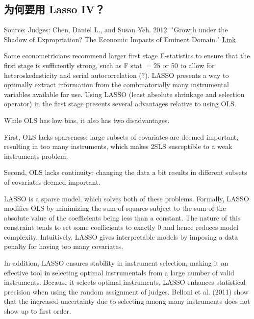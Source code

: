 {\subsection{为何要用 Lasso IV？}

Source: Judges: Chen, Daniel L., and Susan Yeh. 2012. "Growth under the Shadow of Expropriation? The Economic Impacts of Eminent Domain." \href{https://papers.ssrn.com/sol3/papers.cfm?abstract_id=2977074}{Link}

Some econometricians recommend larger first stage F-statistics to ensure that the first stage is sufficiently strong, such as F stat $=25$ or 50 to allow for heteroskedasticity and serial autocorrelation (?). LASSO presents a way to optimally extract information from the combinatorially many instrumental variables available for use. Using LASSO (least absolute shrinkage and selection operator) in the first stage presents several advantages relative to using OLS.

While OLS has low bias, it also has two disadvantages. 

First, OLS lacks sparseness: large subsets of covariates are deemed important, resulting in too many instruments, which makes 2SLS susceptible to a weak instruments problem. 

Second, OLS lacks continuity: changing the data a bit results in different subsets of covariates deemed important. 

LASSO is a sparse model, which solves both of these problems. Formally, LASSO modifies OLS by minimizing the sum of squares subject to the sum of the absolute value of the coefficients being less than a constant. The nature of this constraint tends to set some coefficients to exactly 0 and hence reduces model complexity. Intuitively, LASSO gives interpretable models by imposing a data penalty for having too many covariates. 

In addition, LASSO ensures stability in instrument selection, making it an effective tool in selecting optimal instrumentals from a large number of valid instruments. Because it selects optimal instruments, LASSO enhances statistical precision when using the random assignment of judges. Belloni et al. (2011) show that the increased uncertainty due to selecting among many instruments does not show up to first order.

}
